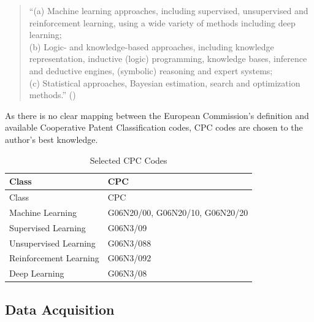 \documentclass[
  12pt,
  a4paperpaper,
]{article}
\begin{document}

\begin{quote}
``(a) Machine learning approaches, including supervised, unsupervised
and reinforcement learning, using a wide variety of methods including
deep learning;\\
(b) Logic- and knowledge-based approaches, including knowledge
representation, inductive (logic) programming, knowledge bases,
inference and deductive engines, (symbolic) reasoning and expert
systems;\\
(c) Statistical approaches, Bayesian estimation, search and optimization
methods.'' ()
\end{quote}


As there is no clear mapping between the European Commission's
definition and available Cooperative Patent Classification codes, CPC
codes are chosen to the author's best knowledge.


\label{tbl-cpc-codes}
\begin{longtable}[]{@{}ll@{}}
\caption{\label{tbl-cpc-codes}Selected CPC Codes}\tabularnewline
\toprule\noalign{}
Class & CPC \\
\midrule\noalign{}
\endfirsthead
\toprule\noalign{}
Class & CPC \\
\midrule\noalign{}
\endhead
\bottomrule\noalign{}
\endlastfoot
Machine Learning & G06N20/00, G06N20/10, G06N20/20 \\
Supervised Learning & G06N3/09 \\
Unsupervised Learning & G06N3/088 \\
Reinforcement Learning & G06N3/092 \\
Deep Learning & G06N3/08 \\
\end{longtable}


\subsection{Data Acquisition}\label{sec-data-acquisition}
\end{document}
